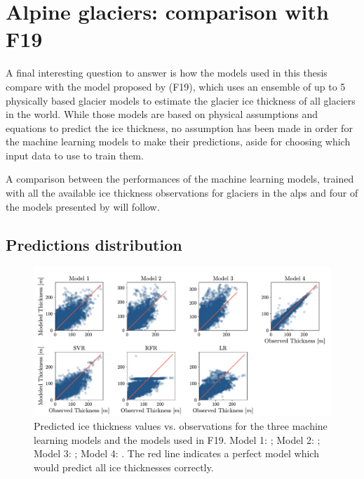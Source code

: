 \section{Alpine glaciers: comparison with F19}\label{disc-alps}

A final interesting question to answer is how the models used in this thesis compare with the model proposed by \citet{Farinotti2019} (F19), which uses an ensemble of up to 5 physically based glacier models to estimate the glacier ice thickness of all glaciers in the world. While those models are based on physical assumptions and equations to predict the ice thickness, no assumption has been made in order for the machine learning models to make their predictions, aside for choosing which input data to use to train them. 

A comparison between the performances of the machine learning models, trained with all the available ice thickness observations for glaciers in the alps and four of the models presented by \citet{Farinotti2019} will follow.

\subsection{Predictions distribution}\label{disc-distr} 

\begin{figure}[!tp]
	\centering		  
	\includegraphics[height=0.7\textwidth, angle=90, origin=c]{figures/physical_comp.pdf}
	\caption{Predicted ice thickness values vs. observations for the three machine learning models and the models used in F19. Model 1: \citet{Huss2012}; Model 2: \citet{Frey2014}; Model 3: \citet{OGGM2019}; Model 4: \citet{Furst2017}. The red line indicates a perfect model which would predict all ice thicknesses correctly.}
	\label{fig:thick-dist}
\end{figure}

